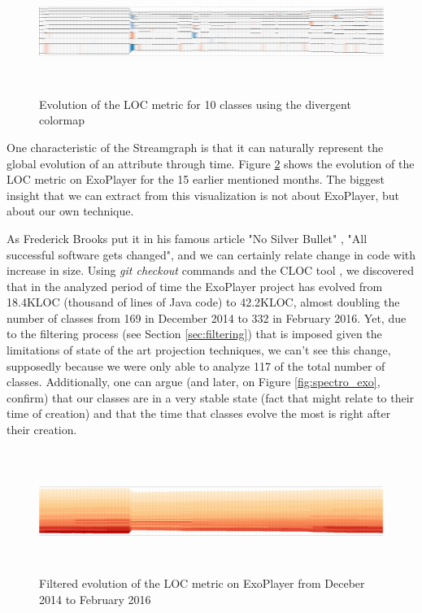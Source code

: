 \begin{figure}[H]
	\centering
	\includegraphics[width=1.0\textwidth,height=4.0cm]{figures/stream_10_loc_div.png}
	\caption{Evolution of the LOC metric for 10 classes using the divergent colormap}
	\label{fig:stream_10_loc_div}
\end{figure}

One characteristic of the Streamgraph is that it can naturally represent the global evolution of an attribute through time. Figure \ref{fig:stream_all_loc} shows the evolution of the LOC metric on ExoPlayer for the 15 earlier mentioned months. The biggest insight that we can extract from this visualization is not about ExoPlayer, but about our own technique.

As Frederick Brooks put it in his famous article "No Silver Bullet" \cite{brooks1987}, "All successful software gets changed", and we can certainly relate change in code with increase in size. Using \textit{git checkout} commands and the CLOC tool \cite{ref:cloc}, we discovered that in the analyzed period of time the ExoPlayer project has evolved from 18.4KLOC (thousand of lines of Java code) to 42.2KLOC, almost doubling the number of classes from 169 in December 2014 to 332 in February 2016. Yet, due to the filtering process (see Section \ref{sec:filtering}) that is imposed given the limitations of state of the art projection techniques, we can't see this change, supposedly because we were only able to analyze 117 of the total number of classes. Additionally, one can argue (and later, on Figure \ref{fig:spectro_exo}, confirm) that our classes are in a very stable state (fact that might relate to their time of creation) and that the time that classes evolve the most is right after their creation.

\begin{figure}[H]
  \centering
  \includegraphics[width=1.0\textwidth,height=4.0cm]{figures/stream_all_loc.png}
  \caption{Filtered evolution of the LOC metric on ExoPlayer from Deceber 2014 to February 2016}
  \label{fig:stream_all_loc}
\end{figure}

